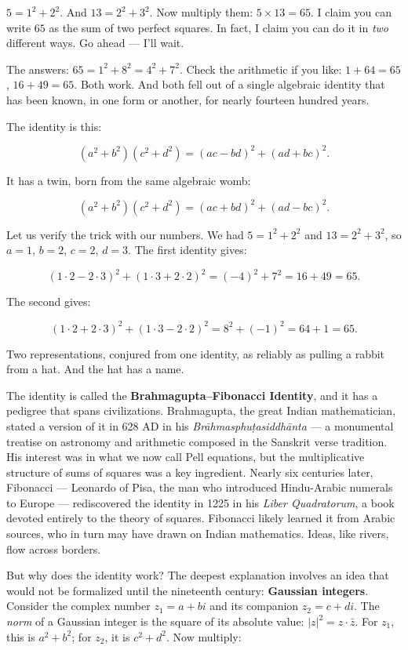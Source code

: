 $5 = 1^2 + 2^2$. And $13 = 2^2 + 3^2$. Now multiply them: $5 \times 13 = 65$. I claim you can write $65$ as the sum of two perfect squares. In fact, I claim you can do it in \textit{two} different ways. Go ahead --- I'll wait.

The answers: $65 = 1^2 + 8^2 = 4^2 + 7^2$. Check the arithmetic if you like: $1 + 64 = 65$, $16 + 49 = 65$. Both work. And both fell out of a single algebraic identity that has been known, in one form or another, for nearly fourteen hundred years.

The identity is this:

\[(a^2 + b^2)(c^2 + d^2) = (ac - bd)^2 + (ad + bc)^2.\]

It has a twin, born from the same algebraic womb:

\[(a^2 + b^2)(c^2 + d^2) = (ac + bd)^2 + (ad - bc)^2.\]

Let us verify the trick with our numbers. We had $5 = 1^2 + 2^2$ and $13 = 2^2 + 3^2$, so $a = 1$, $b = 2$, $c = 2$, $d = 3$. The first identity gives:

\[(1 \cdot 2 - 2 \cdot 3)^2 + (1 \cdot 3 + 2 \cdot 2)^2 = (-4)^2 + 7^2 = 16 + 49 = 65.\]

The second gives:

\[(1 \cdot 2 + 2 \cdot 3)^2 + (1 \cdot 3 - 2 \cdot 2)^2 = 8^2 + (-1)^2 = 64 + 1 = 65.\]

Two representations, conjured from one identity, as reliably as pulling a rabbit from a hat. And the hat has a name.


The identity is called the \textbf{Brahmagupta--Fibonacci Identity}, and it has a pedigree that spans civilizations. Brahmagupta, the great Indian mathematician, stated a version of it in 628 AD in his \textit{Brāhmasphuṭasiddhānta} --- a monumental treatise on astronomy and arithmetic composed in the Sanskrit verse tradition. His interest was in what we now call Pell equations, but the multiplicative structure of sums of squares was a key ingredient. Nearly six centuries later, Fibonacci --- Leonardo of Pisa, the man who introduced Hindu-Arabic numerals to Europe --- rediscovered the identity in 1225 in his \textit{Liber Quadratorum}, a book devoted entirely to the theory of squares. Fibonacci likely learned it from Arabic sources, who in turn may have drawn on Indian mathematics. Ideas, like rivers, flow across borders.

But why does the identity work? The deepest explanation involves an idea that would not be formalized until the nineteenth century: \textbf{Gaussian integers}. Consider the complex number $z_1 = a + bi$ and its companion $z_2 = c + di$. The \textit{norm} of a Gaussian integer is the square of its absolute value: $|z|^2 = z \cdot \bar{z}$. For $z_1$, this is $a^2 + b^2$; for $z_2$, it is $c^2 + d^2$. Now multiply:

